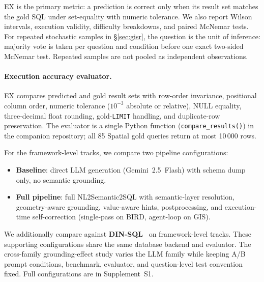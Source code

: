 EX is the primary metric: a prediction is correct only when its result set matches the gold SQL under set-equality with numeric tolerance. We also report Wilson intervals, execution validity, difficulty breakdowns, and paired McNemar tests. For repeated stochastic samples in \S\ref{sec:gisr}, the question is the unit of inference: majority vote is taken per question and condition before one exact two-sided McNemar test. Repeated samples are not pooled as independent observations.

\paragraph{Execution accuracy evaluator.}
EX compares predicted and gold result sets with row-order invariance, positional column order, numeric tolerance ($10^{-3}$ absolute or relative), NULL equality, three-decimal float rounding, gold-\texttt{LIMIT} handling, and duplicate-row preservation. The evaluator is a single Python function (\texttt{compare\_results()}) in the companion repository; all 85 Spatial gold queries return at most 10\,000 rows.

For the framework-level tracks, we compare two pipeline configurations:
\begin{itemize}[leftmargin=*]
  \item \textbf{Baseline}: direct LLM generation (Gemini~2.5~Flash) with schema dump only, no semantic grounding.
  \item \textbf{Full pipeline}: full NL2Semantic2SQL with semantic-layer resolution, geometry-aware grounding, value-aware hints, postprocessing, and execution-time self-correction (single-pass on BIRD, agent-loop on GIS).
\end{itemize}

We additionally compare against \textbf{DIN-SQL}~\citep{pourreza2023dinsql} on framework-level tracks. These supporting configurations share the same database backend and evaluator. The cross-family grounding-effect study varies the LLM family while keeping A/B prompt conditions, benchmark, evaluator, and question-level test convention fixed. Full configurations are in Supplement~S1.
